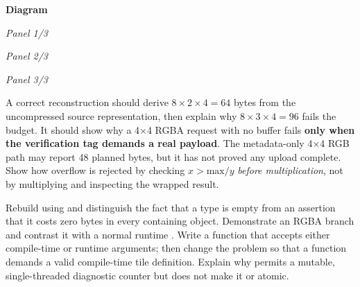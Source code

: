 \par\medskip\noindent\textbf{Diagram}\par
\par\noindent\textit{Panel 1/3}\par{}\par
\par\noindent\textit{Panel 2/3}\par{}\par
\par\noindent\textit{Panel 3/3}\par{}\par

A correct reconstruction should derive \(8\times2\times4=64\) bytes from the uncompressed source representation, then explain why \(8\times3\times4=96\) fails the budget. It should show why a 4×4 RGBA request with no buffer fails \textbf{only when the verification tag demands a real payload}. The metadata-only 4×4 RGB path may report 48 planned bytes, but it has not proved any upload complete. Show how overflow is rejected by checking \(x > \mathrm{max}/y\) \emph{before multiplication}, not by multiplying and inspecting the wrapped result.

Rebuild  using  and distinguish the fact that a type is empty from an assertion that it costs zero bytes in every containing object. Demonstrate an  RGBA branch and contrast it with a normal runtime . Write a  function that accepts either compile-time or runtime arguments; then change the problem so that a  function demands a valid compile-time tile definition. Explain why  permits a mutable, single-threaded diagnostic counter but does not make it  or atomic.

